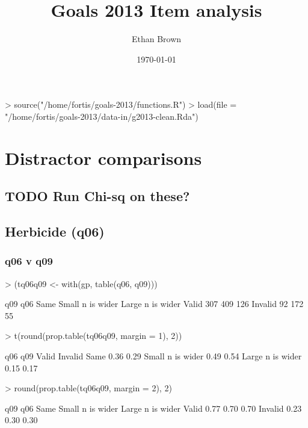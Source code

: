 \documentclass[11pt]{article}
\author{Ethan Brown}
\date{\today}
\title{Goals 2013 Item analysis}
\begin{document}
\maketitle
\begin{Schunk}
\begin{Sinput}
> source("/home/fortis/goals-2013/functions.R")
> load(file = "/home/fortis/goals-2013/data-in/g2013-clean.Rda")
\end{Sinput}
\end{Schunk}

\section{Distractor comparisons}
\label{sec-1}

\subsection{{\bfseries\sffamily TODO} Run Chi-sq on these?}
\label{sec-1-1}
\subsection{Herbicide (q06)}
\label{sec-1-2}
\subsubsection{q06 v q09}
\label{sec-1-2-1}
\begin{Schunk}
\begin{Sinput}
> (tq06q09 <- with(gp, table(q06, q09)))
\end{Sinput}
\begin{Soutput}
         q09
q06       Same Small n is wider Large n is wider
  Valid    307              409              126
  Invalid   92              172               55
\end{Soutput}
\begin{Sinput}
> t(round(prop.table(tq06q09, margin = 1), 2))
\end{Sinput}
\begin{Soutput}
                  q06
q09                Valid Invalid
  Same              0.36    0.29
  Small n is wider  0.49    0.54
  Large n is wider  0.15    0.17
\end{Soutput}
\begin{Sinput}
> round(prop.table(tq06q09, margin = 2), 2)
\end{Sinput}
\begin{Soutput}
         q09
q06       Same Small n is wider Large n is wider
  Valid   0.77             0.70             0.70
  Invalid 0.23             0.30             0.30
\end{Soutput}
\end{Schunk}
\end{document}
